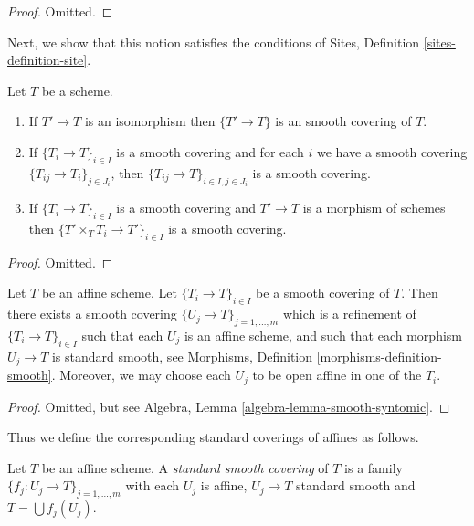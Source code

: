 \begin{proof}
Omitted.
\end{proof}

\noindent
Next, we show that this notion satisfies the conditions of
Sites, Definition \ref{sites-definition-site}.

\begin{lemma}
\label{lemma-smooth}
Let $T$ be a scheme.
\begin{enumerate}
\item If $T' \to T$ is an isomorphism then $\{T' \to T\}$
is an smooth covering of $T$.
\item If $\{T_i \to T\}_{i\in I}$ is a smooth covering and for each
$i$ we have a smooth covering $\{T_{ij} \to T_i\}_{j\in J_i}$, then
$\{T_{ij} \to T\}_{i \in I, j\in J_i}$ is a smooth covering.
\item If $\{T_i \to T\}_{i\in I}$ is a smooth covering
and $T' \to T$ is a morphism of schemes then
$\{T' \times_T T_i \to T'\}_{i\in I}$ is a smooth covering.
\end{enumerate}
\end{lemma}

\begin{proof}
Omitted.
\end{proof}

\begin{lemma}
\label{lemma-smooth-affine}
Let $T$ be an affine scheme.
Let $\{T_i \to T\}_{i \in I}$ be a smooth covering of $T$.
Then there exists a smooth covering
$\{U_j \to T\}_{j = 1, \ldots, m}$ which is a refinement
of $\{T_i \to T\}_{i \in I}$ such that each $U_j$ is an affine
scheme, and such that each morphism $U_j \to T$ is standard
smooth, see Morphisms, Definition \ref{morphisms-definition-smooth}.
Moreover, we may choose each $U_j$ to be open affine in one of the $T_i$.
\end{lemma}

\begin{proof}
Omitted, but see Algebra, Lemma \ref{algebra-lemma-smooth-syntomic}.
\end{proof}

\noindent
Thus we define the corresponding standard coverings of affines as follows.

\begin{definition}
\label{definition-standard-smooth}
Let $T$ be an affine scheme. A {\it standard smooth covering}
of $T$ is a family $\{f_j : U_j \to T\}_{j = 1, \ldots, m}$
with each $U_j$ is affine, $U_j \to T$ standard smooth
and $T = \bigcup f_j(U_j)$.
\end{definition}

